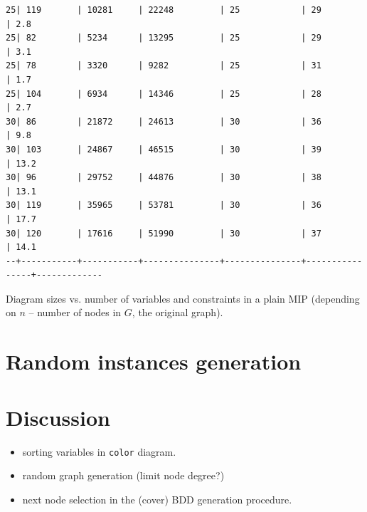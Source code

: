\documentclass[11pt]{article}
\begin{document}
\begin{listing}[htbp]
\begin{verbatim}
25| 119       | 10281     | 22248         | 25            | 29             | 2.8
25| 82        | 5234      | 13295         | 25            | 29             | 3.1
25| 78        | 3320      | 9282          | 25            | 31             | 1.7
25| 104       | 6934      | 14346         | 25            | 28             | 2.7
30| 86        | 21872     | 24613         | 30            | 36             | 9.8
30| 103       | 24867     | 46515         | 30            | 39             | 13.2
30| 96        | 29752     | 44876         | 30            | 38             | 13.1
30| 119       | 35965     | 53781         | 30            | 36             | 17.7
30| 120       | 17616     | 51990         | 30            | 37             | 14.1
--+-----------+-----------+---------------+---------------+----------------+-------------
\end{verbatim}
\caption{\label{fig:sizes}Diagram sizes vs. number of variables and constraints in a plain MIP (depending on \(n\) -- number of nodes in \(G\), the original graph).}
\end{listing}

\section{Random instances generation}
\label{sec:org43b2e60}

\section{Discussion}
\label{sec:org114f8b6}
\begin{itemize}
\item sorting variables in \texttt{color} diagram.
\item random graph generation (limit node degree?)
\item next node selection in the (cover) BDD generation procedure.
\end{itemize}
\end{document}
